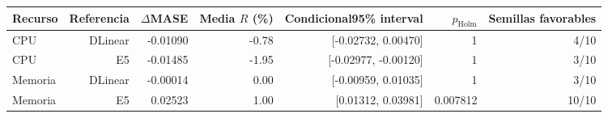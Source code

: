 \begin{tabular}{lrrrrrr}
\toprule
Recurso & Referencia & $\Delta$MASE & Media $R$ (\%) & Condicional95\% interval & $p_{\mathrm{Holm}}$ & Semillas favorables \\
\midrule
CPU & DLinear & -0.01090 & -0.78 & [-0.02732, 0.00470] & 1 & 4/10 \\
CPU & E5 & -0.01485 & -1.95 & [-0.02977, -0.00120] & 1 & 3/10 \\
Memoria & DLinear & -0.00014 & 0.00 & [-0.00959, 0.01035] & 1 & 3/10 \\
Memoria & E5 & 0.02523 & 1.00 & [0.01312, 0.03981] & 0.007812 & 10/10 \\
\bottomrule
\end{tabular}
